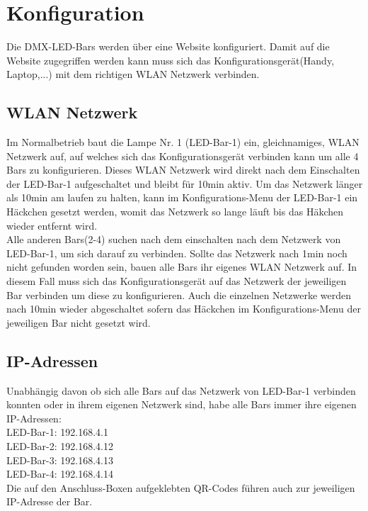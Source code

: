 \documentclass{article}
\begin{document}
\section{Konfiguration}
Die DMX-LED-Bars werden über eine Website konfiguriert. Damit auf die Website zugegriffen werden kann muss sich das Konfigurationsgerät(Handy, Laptop,...) mit dem richtigen WLAN Netzwerk verbinden.
\subsection{WLAN Netzwerk}\label{WLAN Netzwerk}
Im Normalbetrieb baut die Lampe Nr. 1 (LED-Bar-1) ein, gleichnamiges, WLAN Netzwerk auf, auf welches sich das Konfigurationsgerät verbinden kann um alle 4 Bars zu konfigurieren. Dieses WLAN Netzwerk wird direkt nach dem Einschalten der LED-Bar-1 aufgeschaltet und bleibt für 10min aktiv. Um das Netzwerk länger als 10min am laufen zu halten, kann im Konfigurations-Menu der LED-Bar-1 ein Häckchen gesetzt werden, womit das Netzwerk so lange läuft bis das Häkchen wieder entfernt wird.\\
Alle anderen Bars(2-4) suchen nach dem einschalten nach dem Netzwerk von LED-Bar-1, um sich darauf zu verbinden. Sollte das Netzwerk nach 1min noch nicht gefunden worden sein, bauen alle Bars ihr eigenes WLAN Netzwerk auf. In diesem Fall muss sich das Konfigurationsgerät auf das Netzwerk der jeweiligen Bar verbinden um diese zu konfigurieren. Auch die einzelnen Netzwerke werden nach 10min wieder abgeschaltet sofern das Häckchen im Konfigurations-Menu der jeweiligen Bar nicht gesetzt wird.
\subsection{IP-Adressen}
Unabhängig davon ob sich alle Bars auf das Netzwerk von LED-Bar-1 verbinden konnten oder in ihrem eigenen Netzwerk sind, habe alle Bars immer ihre eigenen IP-Adressen:\\
LED-Bar-1: 192.168.4.1\\
LED-Bar-2: 192.168.4.12\\
LED-Bar-3: 192.168.4.13\\
LED-Bar-4: 192.168.4.14\\
Die auf den Anschluss-Boxen aufgeklebten QR-Codes führen auch zur jeweiligen IP-Adresse der Bar.
\end{document}
